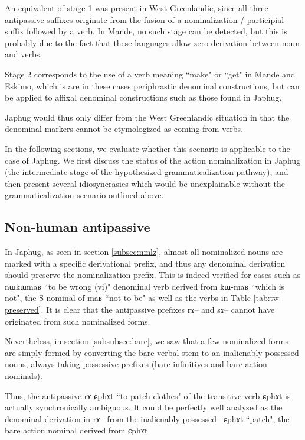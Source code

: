 \documentclass[oldfontcommands,oneside,a4paper,11pt]{article}
\newcommand{\ipa}[1]{{\phon \mbox{#1}}} %
\begin{document}
An equivalent of stage 1  was present in West Greenlandic, since all three antipassive suffixes originate from the fusion of a nominalization / participial suffix followed by a verb. In Mande, no such stage can be detected, but this is probably due to the fact that these languages allow zero derivation between noun and verbs.

Stage 2 corresponds to the use of a verb meaning ``make" or ``get" in Mande and Eskimo, which is are in these cases periphrastic denominal constructions, but can be applied to affixal denominal constructions such as those found in Japhug.

Japhug would thus only differ  from the West Greenlandic situation in that the denominal markers cannot be etymologized as coming from verbs.

In the following sections, we evaluate whether this scenario is applicable to the case of Japhug. We first discuss the status of the action nominalization in Japhug (the intermediate stage of the hypothesized grammaticalization pathway), and then present several idiosyncrasies which would be unexplainable without the grammaticalization scenario outlined above. 

\subsection{Non-human antipassive} \label{subsec:nmlz.denom}
In Japhug, as seen in section \ref{subsec:nmlz}, almost all nominalized nouns are marked with a specific derivational prefix, and thus any denominal derivation should preserve the nominalization prefix. This is indeed verified for cases such as  \ipa{nɯkɯmaʁ} ``to be wrong (vi)" denominal verb derived from \ipa{kɯ-maʁ} ``which is not", the S-nominal of \ipa{maʁ} ``not to be" as well as the verbs in Table \ref{tab:tw-preserved}. It is clear that the antipassive prefixes \ipa{rɤ}-- and \ipa{sɤ}-- cannot have originated from such nominalized forms.

Nevertheless, in section \ref{subsubsec:bare}, we saw that a few nominalized forms are simply formed by converting the bare verbal stem to an inalienably possessed nouns, always taking possessive prefixes (bare infinitives and bare action nominals).

Thus, the antipassive \ipa{rɤ-ɕphɤt} ``to patch clothes" of the transitive verb \ipa{ɕphɤt} is actually synchronically ambiguous. It could be perfectly well analysed as the denominal derivation in \ipa{rɤ}-- from the inalienably possessed \ipa{--ɕphɤt} ``patch", the bare action nominal derived from \ipa{ɕphɤt}.
\end{document}
